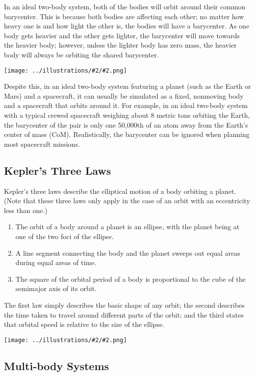 \documentclass[oneside,a5paper]{book}
\newcommand{\widthillustration}[2]{{\centering\texttt{[image: ../illustrations/\#2/\#2.png]}}}
\newcommand{\illustration}[1]{\widthillustration{\linewidth}{#1}}
\begin{document}
In an ideal two-body system, both of the bodies will orbit around
their common barycenter. This is because both bodies are affecting
each other; no matter how heavy one is and how light the other is, the
bodies will have a barycenter. As one body gets heavier and the other
gets lighter, the barycenter will move towards the heavier body;
however, unless the lighter body has zero mass, the heavier body will
always be orbiting the shared barycenter.

\illustration{barycenter}

Despite this, in an ideal two-body system featuring a planet (such as
the Earth or Mars) and a spacecraft, it can usually be simulated as a
fixed, nonmoving body and a spacecraft that orbits around it. For
example, in an ideal two-body system with a typical crewed spacecraft
weighing about 8 metric tons orbiting the Earth, the barycenter of the
pair is only one 50,000th of an atom away from the Earth’s center of
mass (CoM). Realistically, the barycenter can be ignored when planning
most spacecraft missions.

\subsection{Kepler's Three Laws}

Kepler’s three laws describe the elliptical motion of a body orbiting
a planet. (Note that these three laws only apply in the case of an
orbit with an eccentricity less than one.)

\begin{enumerate}
\item The orbit of a body around a planet is an ellipse, with the planet
  being at one of the two foci of the ellipse.
\item A line segment connecting the body and the planet sweeps out equal
  areas during equal areas of time.
\item The square of the orbital period of a body is proportional to the
  cube of the semimajor axis of its orbit.
\end{enumerate}

The first law simply describes the basic shape of any orbit; the
second describes the time taken to travel around different parts of
the orbit; and the third states that orbital speed is relative to the
size of the ellipse.

\illustration{kepler-second-law}

\subsection{Multi-body Systems}
\end{document}
